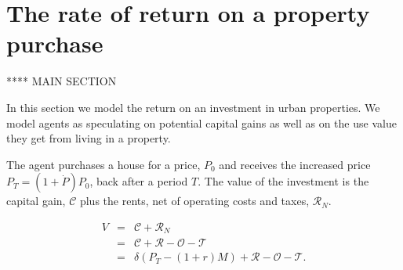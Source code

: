 \section{The rate of return on a property purchase}
**** MAIN SECTION

 
 In this section we model the return on an investment in urban properties. We model agents as %
 speculating on potential \glspl{capital gain} as well as on the \gls{use value} they get from living in a property. %

 The agent purchases a house for a price, $P_0$ %
 and receives the increased price $P_T = (1 + \dot P)P_0$, back after a period $T$. 
The value of the investment is the capital gain, $\mathcal{C}$ plus the rents, net of operating costs and taxes, $\mathcal{R}_N$.


\begin{eqnarray}
V &=& \mathcal{C} + \mathcal{R}_N \nonumber \\
  &=& \mathcal{C} + \mathcal{R} - \mathcal{O} - \mathcal{T} \nonumber \\
  &=& \delta \left(P_T- \left(1+r\right)M\right) + \mathcal{R} - \mathcal{O} - \mathcal{T}.
\label{eqn-v1}
\end{eqnarray}

